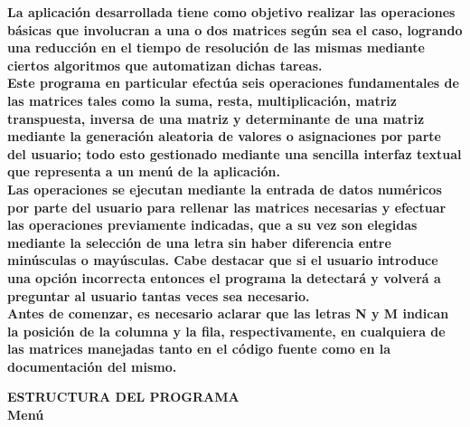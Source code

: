 \documentclass[letterpaper]{article}
\begin{document}
\begin{flushleft}
\textbf{\Large La aplicaci\'on desarrollada tiene como objetivo realizar las operaciones b\'asicas que involucran a una o dos matrices seg\'un sea el caso, logrando una reducci\'on en el tiempo de resoluci\'on de las mismas mediante ciertos algoritmos que automatizan dichas tareas.\\}
\vspace{0.5cm}
\textbf{\Large Este programa en particular efect\'ua seis operaciones fundamentales de las matrices tales como la suma, resta, multiplicaci\'on, matriz transpuesta, inversa de una matriz y determinante de una matriz mediante la generaci\'on aleatoria de valores o asignaciones por parte del usuario; todo esto gestionado mediante una sencilla interfaz textual que representa a un men\'u de la aplicaci\'on.\\}
\vspace{0.5cm}
\textbf{\Large Las operaciones se ejecutan mediante la entrada de datos num\'ericos por parte del usuario para rellenar las matrices necesarias y efectuar las operaciones previamente indicadas, que a su vez son elegidas mediante la selecci\'on de una letra sin haber diferencia entre min\'usculas o may\'usculas. Cabe destacar que si el usuario introduce una opci\'on incorrecta entonces el programa la detectar\'a y volver\'a a preguntar al usuario tantas veces sea necesario.\\}
\vspace{0.5cm}
\textbf{\Large Antes de comenzar, es necesario aclarar que las letras N y M indican la posici\'on de la columna y la fila, respectivamente, en cualquiera de las matrices manejadas tanto en el c\'odigo fuente como en la documentaci\'on del mismo.\\}
\end{flushleft}

\clearpage

\begin{center}
\textbf{\LARGE ESTRUCTURA DEL PROGRAMA\\}
\vspace{1.0cm}
\textbf{\LARGE Men\'u\\}
\vspace{0.5cm}
\end{center}
\end{document}
